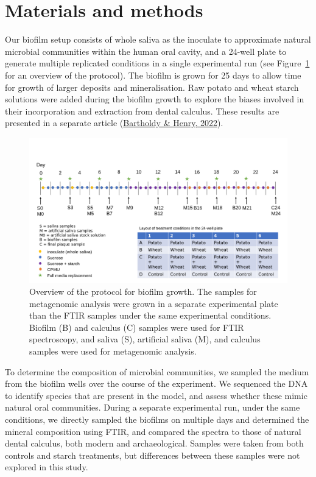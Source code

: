 \documentclass[
  b5paper,
]{book}
\begin{document}
\hypertarget{materials-and-methods}{%
\section{Materials and methods}\label{materials-and-methods}}

Our biofilm setup consists of whole saliva as the inoculate to
approximate natural microbial communities within the human oral cavity,
and a 24-well plate to generate multiple replicated conditions in a
single experimental run (see Figure~\ref{fig-met-protocol} for an
overview of the protocol). The biofilm is grown for 25 days to allow
time for growth of larger deposits and mineralisation. Raw potato and
wheat starch solutions were added during the biofilm growth to explore
the biases involved in their incorporation and extraction from dental
calculus. These results are presented in a separate article
(\protect\hyperlink{ref-bartholdyInvestigatingBiases2022}{Bartholdy \&
Henry, 2022}).

\begin{figure}

{\centering \includegraphics{figures/Exp_protocol.png}

}

\caption{\label{fig-met-protocol}Overview of the protocol for biofilm
growth. The samples for metagenomic analysis were grown in a separate
experimental plate than the FTIR samples under the same experimental
conditions. Biofilm (B) and calculus (C) samples were used for FTIR
spectroscopy, and saliva (S), artificial saliva (M), and calculus
samples were used for metagenomic analysis.}

\end{figure}

To determine the composition of microbial communities, we sampled the
medium from the biofilm wells over the course of the experiment. We
sequenced the DNA to identify species that are present in the model, and
assess whether these mimic natural oral communities. During a separate
experimental run, under the same conditions, we directly sampled the
biofilms on multiple days and determined the mineral composition using
FTIR, and compared the spectra to those of natural dental calculus, both
modern and archaeological. Samples were taken from both controls and
starch treatments, but differences between these samples were not
explored in this study.
\end{document}
